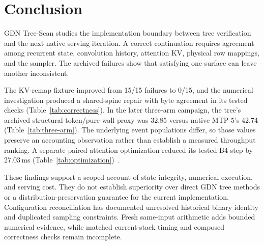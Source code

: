 \documentclass[conference]{IEEEtran}
\newcommand{\sys}{GDN Tree-Scan}
\begin{document}
\section{Conclusion}
\sys{} studies the implementation boundary between tree verification and the next native serving iteration. A correct continuation requires agreement among recurrent state, convolution history, attention KV, physical row mappings, and the sampler. The archived failures show that satisfying one surface can leave another inconsistent.

The KV-remap fixture improved from 15/15 failures to 0/15, and the numerical investigation produced a shared-spine repair with byte agreement in its tested checks (Table~\ref{tab:correctness}). In the later three-arm campaign, the tree's archived structural-token/pure-wall proxy was 32.85 versus native MTP-5's 42.74 (Table~\ref{tab:three-arm}). The underlying event populations differ, so those values preserve an accounting observation rather than establish a measured throughput ranking. A separate paired attention optimization reduced its tested B4 step by 27.03\,ms (Table~\ref{tab:optimization})~\cite{lumo2026archive}.

These findings support a scoped account of state integrity, numerical execution, and serving cost. They do not establish superiority over direct GDN tree methods or a distribution-preservation guarantee for the current implementation. Configuration reconciliation has documented unresolved historical binary identity and duplicated sampling constraints. Fresh same-input arithmetic adds bounded numerical evidence, while matched current-stack timing and composed correctness checks remain incomplete.

\label{ReferencesStart}


\end{document}

